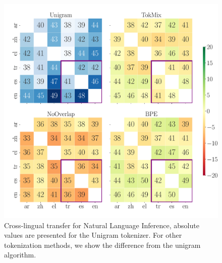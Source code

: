 \begin{figure}[tb!]
    \centering
    \includegraphics[width=1.0\linewidth]{figures/XNLI_Acc_transfer_.pdf}
    
    \caption{Cross-lingual transfer for Natural Language Inference, absolute values are presented for the Unigram tokenizer. For other tokenization methods, we show  the difference from the unigram algorithm.}
    \label{fig:xnli_transfer}
\end{figure}